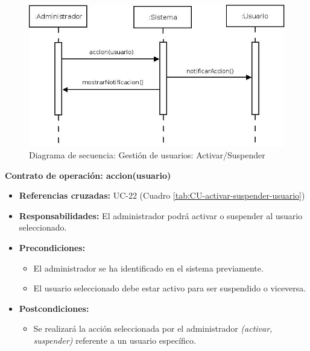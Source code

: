 \begin{figure}[h!]
\centering
  \includegraphics[scale=.50]{img/secuencias/gestion-usuarios-activar-suspender.jpeg}
  \caption{Diagrama de secuencia: Gestión de usuarios: Activar/Suspender}
  \label{fig:secuencia-gestion-usuarios-activar-suspender}
\end{figure}

\textbf{Contrato de operación: accion(usuario)}
\begin{itemize}
\item \textbf{Referencias cruzadas:} UC-22 (Cuadro \ref{tab:CU-activar-suspender-usuario})
\item \textbf{Responsabilidades:} El administrador podrá activar o suspender al usuario seleccionado.
\item \textbf{Precondiciones:} 
 \begin{itemize}
\item El administrador se ha identificado en el sistema previamente.
\item El usuario seleccionado debe estar activo para ser suspendido o viceversa.
\end {itemize}
\item \textbf{Postcondiciones:} 
 \begin{itemize}
\item Se realizará la acción seleccionada por el administrador \textit{(activar, suspender)} referente a un usuario específico.
\end {itemize}
\end {itemize}

